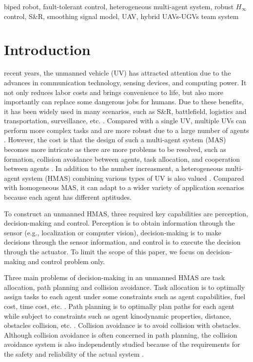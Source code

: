 \documentclass{ieeeaccess}
\begin{document}
\begin{keywords}
biped robot, fault-tolerant control, heterogeneous multi-agent system, robust $H_\infty$ control, S\&R, smoothing signal model, UAV, hybrid UAVs-UGVs team system
\end{keywords}
\titlepgskip=-15pt

\maketitle

\section{Introduction}
 recent years, the unmanned vehicle (UV) has attracted attention due to the advances in communication technology, sensing devices, and computing power. It not only reduces labor costs and brings convenience to life, but also more importantly can replace some dangerous jobs for humans. Due to these benefits, it has been widely used in many scenarios, such as S\&R, battlefield, logistics and transportation, surveillance, etc. \cite{9700861}. Compared with a single UV, multiple UVs can perform more complex tasks and are more robust due to a large number of agents \cite{8352646}. However, the cost is that the design of such a multi-agent system (MAS) becomes more intricate as there are more problems to be resolved, such as formation, collision avoidance between agents, task allocation, and cooperation between agents \cite{chen2019control}. In addition to the number increasment, a heterogeneous multi-agent system (HMAS) combining various types of UV is also valued \cite{9371292}. Compared with homogeneous MAS, it can adapt to a wider variety of application scenarios because each agent has different aptitudes.

To construct an unmanned HMAS, three required key capabilities are perception, decision-making and control. Perception is to obtain information through the sensor (e.g., localization or computer vision), decision-making is to make decisions through the sensor information, and control is to execute the decision through the actuator. To limit the scope of this paper, we focus on decision-making and control problem only.

Three main problems of decision-making in an unmanned HMAS are task allocation, path planning and collision avoidance. Task allocation is to optimally assign tasks to each agent under some constraints such as agent capabilities, fuel cost, time cost, etc. \cite{skaltsis2021survey}. Path planning is to optimally plan paths for each agent while subject to constraints such as agent kinodynamic properties, distance, obstacles collision, etc. \cite{zhang2018path}. Collision avoidance is to avoid collision with obstacles. Although collision avoidance is often concerned in path planning, the collision avoidance system is also independently studied because of the requirements for the safety and reliability of the actual system \cite{9108245}.
\end{document}
